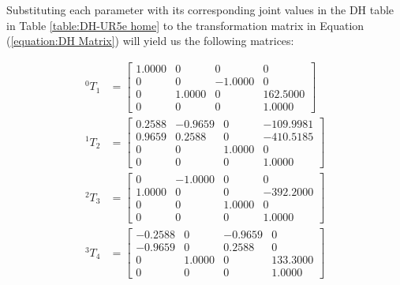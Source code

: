 Substituting each parameter with its corresponding joint values in the DH table in Table \ref{table:DH-UR5e home} to the transformation matrix in Equation (\ref{equation:DH Matrix}) will yield us the following matrices:

\begin{equation*}
    \begin{split}
        ^{0}T_{1} & = \begin{bmatrix}
                          1.0000 & 0      & 0       & 0        \\
                          0      & 0      & -1.0000 & 0        \\
                          0      & 1.0000 & 0       & 162.5000 \\
                          0      & 0      & 0       & 1.0000
                      \end{bmatrix}  \\
        ^{1}T_{2} & = \begin{bmatrix}
                          0.2588 & -0.9659 & 0      & -109.9981 \\
                          0.9659 & 0.2588  & 0      & -410.5185 \\
                          0      & 0       & 1.0000 & 0         \\
                          0      & 0       & 0      & 1.0000
                      \end{bmatrix} \\
        ^{2}T_{3} & = \begin{bmatrix}
                          0      & -1.0000 & 0      & 0         \\
                          1.0000 & 0       & 0      & -392.2000 \\
                          0      & 0       & 1.0000 & 0         \\
                          0      & 0       & 0      & 1.0000
                      \end{bmatrix} \\
        ^{3}T_{4} & = \begin{bmatrix}
                          -0.2588 & 0      & -0.9659 & 0        \\
                          -0.9659 & 0      & 0.2588  & 0        \\
                          0       & 1.0000 & 0       & 133.3000 \\
                          0       & 0      & 0       & 1.0000
                      \end{bmatrix} \\

\end{split}
\end{equation*}
